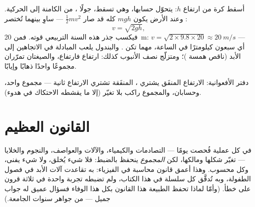 \begin{example}\label{ex:g9:energy-conversions:trade}
أسقط كرة من ارتفاع $h$: يتحوّل حسابها، وهي تسقط، جولًا ،
من الكامنة إلى الحركية. وعند الأرض يكون $m g h$ كله قد صار
$\frac12 m v^2$ --- ساوِ بينهما تُختصر :
\[
v = \sqrt{2 g h},
\]
فيكسب جذر هذه السنة التربيعي قوته. فمن \qty{20}{m}:
$v = \sqrt{2 \times 9.8 \times 20} \approx \qty{20}{m/s}$ ---
أي سبعون كيلومترًا في الساعة، مهما تكن . والبندول يلعب
المبادلة في الاتجاهين إلى الأبد (ناقص همسة )؛ ومتزلّج
نصف الأنبوب كذلك: ارتفاع  فارتفاع، والصيغتان تمرّران
مجموعًا واحدًا ذهابًا وإيابًا.
\end{example}

\begin{omfigure}

{\small دفتر الأفعوانية: الارتفاع المنفَق يشتري ، 
المنفَقة تشتري الارتفاع ثانية --- مجموع واحد، وحسابان، والمجموع
راكب بلا تغيّر (إلا ما يقشطه الاحتكاك في هدوء).}
\end{omfigure}

\section{القانون العظيم}

\begin{proposition}\label{prop:g9:energy-conversions:conservation}
في كل عملية فُحصت يومًا --- التصادمات والكيمياء، والآلات
والعواصف، والنجوم والخلايا --- تغيّر  شكلها ومالكها،
لكن \emph{المجموع} ينحفظ بالضبط: فلا شيء يُخلق، ولا شيء يفنى،
وكل  محسوب. وهذا أعمق قانون محاسبة في الفيزياء: به تقاعدت
آلات الأبد في فصول الطفولة، وبه تُدقَّق كل سلسلة في هذا
الكتاب، ولم تضبطه تجربة واحدة في ثلاثة قرون على خطأ. (وأمّا
لماذا تحفظ الطبيعة هذا القانون بكل هذا الوفاء فسؤال عميق له
جواب جميل --- من جواهر سنوات الجامعة.)
\end{proposition}

